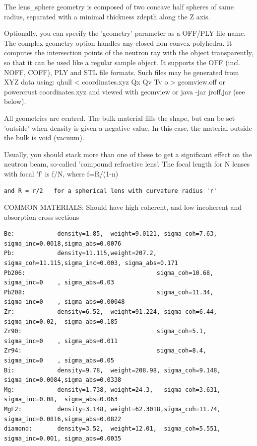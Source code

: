The lens\_sphere geometry is composed of two concave half spheres of same radius, separated with a minimal thickness zdepth along the Z axis.

Optionally, you can specify the 'geometry' parameter as a OFF/PLY file name. The complex geometry option handles any closed non-convex polyhedra. It computes the intersection points of the neutron ray with the object transparently, so that it can be used like a regular sample object. It supports the OFF (incl. NOFF, COFF), PLY and STL file formats. Such files may be generated from XYZ data using: qhull \textless{} coordinates.xyz Qx Qv Tv o \textgreater{} geomview.off or powercrust coordinates.xyz and viewed with geomview or java -jar jroff.jar (see below).

All geometries are centred. The bulk material fills the shape, but can be set 'outside' when density is given a negative value. In this case, the material outside the bulk is void (vacuum).

Usually, you should stack more than one of these to get a significant effect on the neutron beam, so-called 'compound refractive lens'. The focal length for N lenses with focal 'f' is f/N, where f=R/(1-n)

\begin{verbatim}
and R = r/2   for a spherical lens with curvature radius 'r'
\end{verbatim}

COMMON MATERIALS: Should have high coherent, and low incoherent and absorption cross sections

\begin{verbatim}
Be:            density=1.85,  weight=9.0121, sigma_coh=7.63,  sigma_inc=0.0018,sigma_abs=0.0076
Pb:            density=11.115,weight=207.2,  sigma_coh=11.115,sigma_inc=0.003, sigma_abs=0.171
Pb206:                                     sigma_coh=10.68, sigma_inc=0    , sigma_abs=0.03
Pb208:                                     sigma_coh=11.34, sigma_inc=0    , sigma_abs=0.00048
Zr:            density=6.52,  weight=91.224, sigma_coh=6.44,  sigma_inc=0.02,  sigma_abs=0.185
Zr90:                                      sigma_coh=5.1,   sigma_inc=0    , sigma_abs=0.011
Zr94:                                      sigma_coh=8.4,   sigma_inc=0    , sigma_abs=0.05
Bi:            density=9.78,  weight=208.98, sigma_coh=9.148, sigma_inc=0.0084,sigma_abs=0.0338
Mg:            density=1.738, weight=24.3,   sigma_coh=3.631, sigma_inc=0.08,  sigma_abs=0.063
MgF2:          density=3.148, weight=62.3018,sigma_coh=11.74, sigma_inc=0.0816,sigma_abs=0.0822
diamond:       density=3.52,  weight=12.01,  sigma_coh=5.551, sigma_inc=0.001, sigma_abs=0.0035
\end{verbatim}

